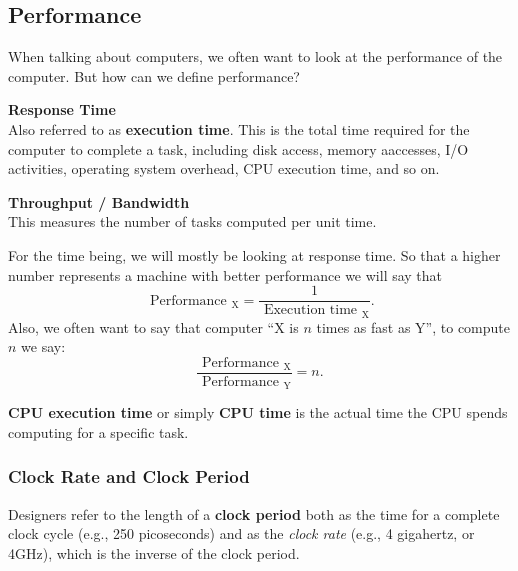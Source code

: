 \documentclass[10pt]{article}
\begin{document}
\subsection{Performance}\label{subsec:}
When talking about computers, we often want to look at the performance of the computer.  But how can we define performance?
\begin{definition}
  \textbf{Response Time}\\
  Also referred to as \textbf{execution time}.  This is the total time required for the computer to complete a task, including disk access, memory aaccesses, I/O activities, operating system overhead, CPU execution time, and so on.
\end{definition}
\begin{definition}
  \textbf{Throughput / Bandwidth}\\
  This measures the number of tasks computed per unit time.
\end{definition}
For the time being, we will mostly be looking at response time.  So that a higher number represents a machine with better performance we will say that
\[\text { Performance }_{\mathrm{X}}=\frac{1}{\text { Execution time }_{\mathrm{X}}}.\]
Also, we often want to say that computer ``X is $n$ times as fast as Y'', to compute $n$ we say:
\[\frac{\text { Performance }_{\mathrm{X}}}{\text { Performance }_{\mathrm{Y}}}=n.\]
\begin{marginfigure}
\textbf{CPU execution time} or simply \textbf{CPU time} is the actual time the CPU spends computing for a specific task.
\end{marginfigure}%
\subsubsection{Clock Rate and Clock Period}
Designers refer to the length of a \textbf{clock period} both as the time for a complete clock cycle (e.g., 250 picoseconds) and as the \textit{clock rate} (e.g., 4 gigahertz, or 4GHz), which is the inverse of the clock period.
\end{document}
